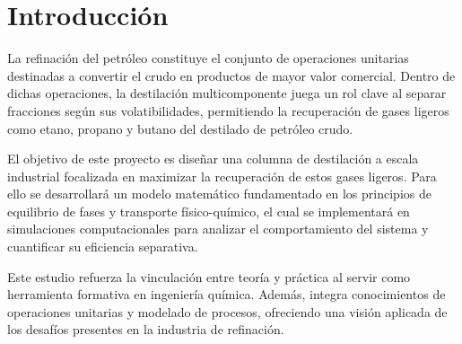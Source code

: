 \section{Introducción}
La refinación del petróleo constituye el conjunto de operaciones unitarias destinadas a convertir el crudo en productos de mayor valor comercial. Dentro de dichas operaciones, la destilación multicomponente juega un rol clave al separar fracciones según sus volatibilidades, permitiendo la recuperación de gases ligeros como etano, propano y butano del destilado de petróleo crudo.

El objetivo de este proyecto es diseñar una columna de destilación a escala industrial focalizada en maximizar la recuperación de estos gases ligeros. Para ello se desarrollará un modelo matemático fundamentado en los principios de equilibrio de fases y transporte físico-químico, el cual se implementará en simulaciones computacionales para analizar el comportamiento del sistema y cuantificar su eficiencia separativa.

Este estudio refuerza la vinculación entre teoría y práctica al servir como herramienta formativa en ingeniería química. Además, integra conocimientos de operaciones unitarias y modelado de procesos, ofreciendo una visión aplicada de los desafíos presentes en la industria de refinación.
